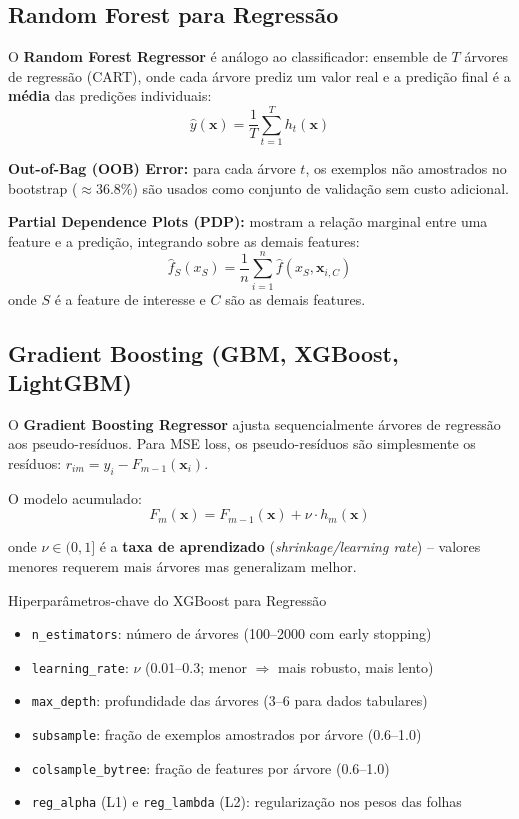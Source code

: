 \documentclass[12pt,a4paper]{article}
\begin{document}
\subsection{Random Forest para Regressão}

O \textbf{Random Forest Regressor} é análogo ao classificador: ensemble de $T$ árvores de regressão (CART), onde cada árvore prediz um valor real e a predição final é a \textbf{média} das predições individuais:
\[
  \hat{y}(\mathbf{x}) = \frac{1}{T}\sum_{t=1}^T h_t(\mathbf{x})
\]

\textbf{Out-of-Bag (OOB) Error:} para cada árvore $t$, os exemplos não amostrados no bootstrap ($\approx 36.8\%$) são usados como conjunto de validação sem custo adicional.

\textbf{Partial Dependence Plots (PDP):} mostram a relação marginal entre uma feature e a predição, integrando sobre as demais features:
\[
  \hat{f}_S(x_S) = \frac{1}{n}\sum_{i=1}^n \hat{f}(x_S, \mathbf{x}_{i,C})
\]
onde $S$ é a feature de interesse e $C$ são as demais features.

\subsection{Gradient Boosting (GBM, XGBoost, LightGBM)}

O \textbf{Gradient Boosting Regressor} ajusta sequencialmente árvores de regressão aos pseudo-resíduos. Para MSE loss, os pseudo-resíduos são simplesmente os resíduos: $r_{im} = y_i - F_{m-1}(\mathbf{x}_i)$.

O modelo acumulado:
\[
  F_m(\mathbf{x}) = F_{m-1}(\mathbf{x}) + \nu \cdot h_m(\mathbf{x})
\]

onde $\nu \in (0,1]$ é a \textbf{taxa de aprendizado} (\textit{shrinkage/learning rate}) -- valores menores requerem mais árvores mas generalizam melhor.

\begin{dicabox}{Hiperparâmetros-chave do XGBoost para Regressão}
\begin{itemize}
  \item \texttt{n\_estimators}: número de árvores (100--2000 com early stopping)
  \item \texttt{learning\_rate}: $\nu$ (0.01--0.3; menor $\Rightarrow$ mais robusto, mais lento)
  \item \texttt{max\_depth}: profundidade das árvores (3--6 para dados tabulares)
  \item \texttt{subsample}: fração de exemplos amostrados por árvore (0.6--1.0)
  \item \texttt{colsample\_bytree}: fração de features por árvore (0.6--1.0)
  \item \texttt{reg\_alpha} (L1) e \texttt{reg\_lambda} (L2): regularização nos pesos das folhas
\end{itemize}
\end{dicabox}
\end{document}
